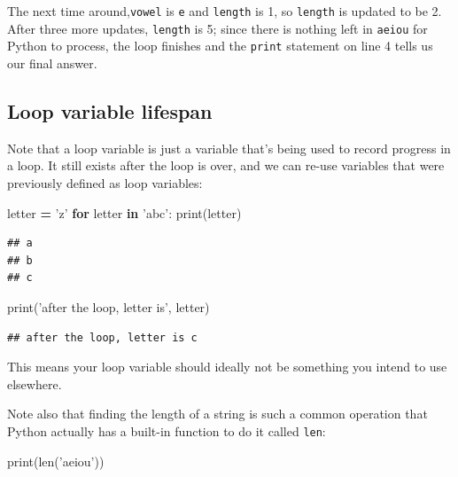 \documentclass[]{book}
\newenvironment{Shaded}{\begin{snugshade}}{\end{snugshade}}
\newcommand{\BuiltInTok}[1]{#1}
\newcommand{\ControlFlowTok}[1]{\textcolor[rgb]{0.13,0.29,0.53}{\textbf{#1}}}
\newcommand{\KeywordTok}[1]{\textcolor[rgb]{0.13,0.29,0.53}{\textbf{#1}}}
\newcommand{\NormalTok}[1]{#1}
\newcommand{\OperatorTok}[1]{\textcolor[rgb]{0.81,0.36,0.00}{\textbf{#1}}}
\newcommand{\StringTok}[1]{\textcolor[rgb]{0.31,0.60,0.02}{#1}}
\theoremstyle{definition}
\theoremstyle{definition}
\theoremstyle{definition}
\theoremstyle{remark}
\begin{document}
The next time around,\texttt{vowel} is
\texttt{\textquotesingle{}e\textquotesingle{}} and \texttt{length} is 1,
so \texttt{length} is updated to be 2. After three more updates,
\texttt{length} is 5; since there is nothing left in
\texttt{\textquotesingle{}aeiou\textquotesingle{}} for Python to
process, the loop finishes and the \texttt{print} statement on line 4
tells us our final answer.

\hypertarget{loop-variable-lifespan}{%
\subsection{Loop variable lifespan}\label{loop-variable-lifespan}}

Note that a loop variable is just a variable that's being used to record
progress in a loop. It still exists after the loop is over, and we can
re-use variables that were previously defined as loop variables:

\begin{Shaded}
\begin{Highlighting}[]
\NormalTok{letter }\OperatorTok{=} \StringTok{'z'}
\ControlFlowTok{for}\NormalTok{ letter }\KeywordTok{in} \StringTok{'abc'}\NormalTok{:}
    \BuiltInTok{print}\NormalTok{(letter)}
\end{Highlighting}
\end{Shaded}

\begin{verbatim}
## a
## b
## c
\end{verbatim}

\begin{Shaded}
\begin{Highlighting}[]
\BuiltInTok{print}\NormalTok{(}\StringTok{'after the loop, letter is'}\NormalTok{, letter)}
\end{Highlighting}
\end{Shaded}

\begin{verbatim}
## after the loop, letter is c
\end{verbatim}

This means your loop variable should ideally not be something you intend
to use elsewhere.

Note also that finding the length of a string is such a common operation
that Python actually has a built-in function to do it called
\texttt{len}:

\begin{Shaded}
\begin{Highlighting}[]
\BuiltInTok{print}\NormalTok{(}\BuiltInTok{len}\NormalTok{(}\StringTok{'aeiou'}\NormalTok{))}
\end{Highlighting}
\end{Shaded}
\end{document}
